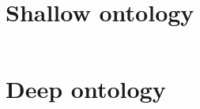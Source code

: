 \documentclass{article}
\newcommand{\shallow}[1]{\both{../data/shallow/#1.tex}}
\newcommand{\deep}[1]{\both{../data/deep/#1.tex}}
\newcommand{\both}[1]{
\begin{tabular}{ll}

\end{tabular}}
\begin{document}
\section{Shallow ontology}

\shallow{Language}

\section{Deep ontology}

\deep{Language}
\end{document}
